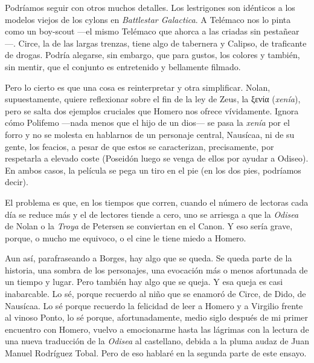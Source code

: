 \documentclass[11pt,a4paper]{article}
\newcommand{\gr}[1]{\foreignlanguage{greek}{#1}}
\begin{document}
Podríamos seguir con otros muchos detalles. Los lestrigones son idénticos a los modelos viejos de los cylons en \emph{Battlestar Galactica}. A Telémaco nos lo pinta como un boy-scout ---el mismo Telémaco que ahorca a las criadas sin pestañear---. Circe, la de las largas trenzas, tiene algo de tabernera y Calipso, de traficante de drogas. Podría alegarse, sin embargo, que para gustos, los colores y también, sin mentir, que el conjunto es entretenido y bellamente filmado. 

Pero lo cierto es que una cosa es reinterpretar y otra simplificar. Nolan, supuestamente, quiere reflexionar sobre el fin de la ley de Zeus, la \gr{ξενία} (\emph{xenía}), pero se salta dos ejemplos cruciales que Homero nos ofrece vívidamente. Ignora cómo Polifemo ---nada menos que el hijo de un dios--- se pasa la \emph{xenía} por el forro y no se molesta en hablarnos de un personaje central, Nausícaa, ni de su gente, los feacios, a pesar de que estos se caracterizan, precisamente, por respetarla a elevado coste (Poseidón luego se venga de ellos por ayudar a Odiseo). En ambos casos, la película se pega un tiro en el pie (en los dos pies, podríamos decir). 

El problema es que, en los tiempos que corren, cuando el número de lectoras cada día se reduce más y el de lectores tiende a cero, uno se arriesga a que la \emph{Odisea} de Nolan o la \emph{Troya} de Petersen se conviertan en el Canon. Y eso sería grave, porque, o mucho me equivoco, o el cine le tiene miedo a Homero. 

Aun así, parafraseando a Borges, hay algo que se queda. Se queda parte de la historia, una sombra de los personajes, una evocación más o menos afortunada de un tiempo y lugar. Pero también hay algo que se queja. Y esa queja es casi inabarcable. Lo sé, porque recuerdo al niño que se enamoró de Circe, de Dido, de Nausícaa. Lo sé porque recuerdo la felicidad de leer a Homero y a Virgilio frente al vinoso Ponto, lo sé porque, afortunadamente, medio siglo después de mi primer encuentro con Homero, vuelvo a emocionarme hasta las lágrimas con la lectura de una nueva traducción de la \emph{Odisea} al castellano, debida a la pluma audaz de Juan Manuel Rodríguez Tobal. Pero de eso hablaré en la segunda parte de este ensayo. 


\end{document}
